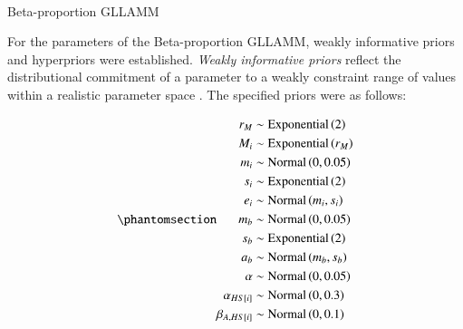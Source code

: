 \documentclass[
  authoryear,
  preprint,
  1p]{elsarticle}
\makeatletter
\let\oldparagraph\paragraph
\renewcommand{\paragraph}{
    \@ifstar
      \xxxParagraphStar
      \xxxParagraphNoStar
  }
\newcommand{\xxxParagraphStar}[1]{\oldparagraph*{#1}\mbox{}}
\newcommand{\xxxParagraphNoStar}[1]{\oldparagraph{#1}\mbox{}}
\makeatother
\begin{document}
\paragraph{Beta-proportion GLLAMM}\label{sec-M-SM-P-BGLLAMM}

For the parameters of the Beta-proportion GLLAMM, weakly informative
priors and hyperpriors were established. \emph{Weakly informative
priors} reflect the distributional commitment of a parameter to a weakly
constraint range of values within a realistic parameter space
\citep{McElreath_2020}. The specified priors were as follows:

\begin{equation}\phantomsection\label{eq-beta-GLLAMM-priors}{
\begin{aligned}
r_{M} &\sim \text{Exponential}\left( 2 \right) \\ 
M_{i} &\sim \text{Exponential}\left( r_{M} \right) \\
m_{i} &\sim \text{Normal} \left( 0, 0.05 \right) \\
s_{i} &\sim \text{Exponential} \left( 2 \right) \\
e_{i} &\sim \text{Normal} \left( m_{i}, s_{i} \right) \\
m_{b} &\sim \text{Normal} \left( 0, 0.05 \right) \\
s_{b} &\sim \text{Exponential} \left( 2 \right) \\
a_{b} &\sim \text{Normal} \left( m_{b}, s_{b} \right) \\
\alpha &\sim \text{Normal} \left( 0, 0.05 \right) \\
\alpha_{HS[i]} &\sim \text{Normal} \left( 0, 0.3 \right) \\
\beta_{A,HS[i]} &\sim \text{Normal} \left( 0, 0.1 \right)
\end{aligned} 
}\end{equation}
\end{document}
